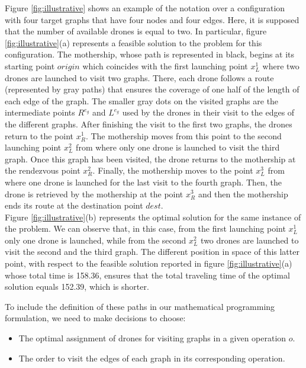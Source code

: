 \documentclass[10pt,a4paper]{elsarticle}
\newcommand{\EN}[1]{{\color{black}#1}}
\begin{document}
\noindent
Figure \ref{fig:illustrative} shows an example of the notation over a configuration with four target graphs that have four nodes and four edges. Here, it is supposed that the number of available drones is equal to two.  
In particular, figure \ref{fig:illustrative}(a) represents a feasible solution \EN{to} the problem for this configuration.
The mothership, whose path is represented in black, begins at its starting point $origin$ which coincides with the first launching point $x_L^1$ where two drones are launched to visit two graphs. There, each drone follows a route (represented by gray paths) that ensures the coverage of one half of the length of each edge of the graph. The smaller gray dots on the visited graphs are the intermediate points $R^{e_g}$ and $L^{e_g}$ used by the drones in their visit to the edges of the different graphs. After finishing the visit \EN{to} the first two graphs, the drones return to the point $x_R^1$. The mothership moves from this point to the second launching point $x_L^2$ from where only one drone is launched to visit the third graph. Once this graph \EN{has been} visited, the drone returns to the mothership at the rendezvous point $x_R^2$. Finally, the mothership moves to the point $x_L^3$ from where one drone is launched for the last visit to the fourth graph. Then, the drone is retrieved by the mothership at the point $x_R^3$ and then the mothership ends its route at the destination point $dest$.\\
Figure \ref{fig:illustrative}(b) represents the optimal solution for the same instance of the problem. We can observe that, in this case, from the first launching point $x_L^1$ only one drone is launched, while from the second $x_L^2$ two drones are launched to visit the second and the third graph. The different position in space of this latter point, with respect to the feasible solution reported in figure \ref{fig:illustrative}(a) whose total time is 158.36, ensures that the total traveling time of the optimal solution equals 152.39, which is shorter.



\noindent
To include the definition of these paths in our mathematical programming formulation, we need to make decisions to choose:
\begin{itemize}
\item The optimal assignment of drones for visiting graphs in a given operation $o$.
\item The order to visit the edges of each graph in its corresponding operation.
\end{itemize}
\end{document}
